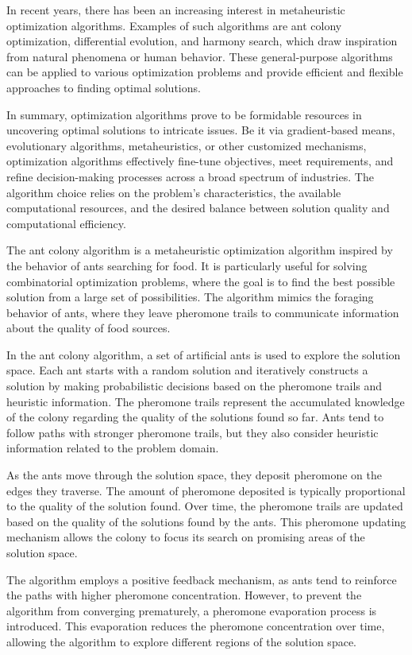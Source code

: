 In recent years, there has been an increasing interest in metaheuristic optimization algorithms. Examples of such algorithms are ant colony optimization, differential evolution, and harmony search, which draw inspiration from natural phenomena or human behavior. These general-purpose algorithms can be applied to various optimization problems and provide efficient and flexible approaches to finding optimal solutions.

In summary, optimization algorithms prove to be formidable resources in uncovering optimal solutions to intricate issues. Be it via gradient-based means, evolutionary algorithms, metaheuristics, or other customized mechanisms, optimization algorithms effectively fine-tune objectives, meet requirements, and refine decision-making processes across a broad spectrum of industries. The algorithm choice relies on the problem's characteristics, the available computational resources, and the desired balance between solution quality and computational efficiency.

The ant colony algorithm is a metaheuristic optimization algorithm inspired by the behavior of ants searching for food. It is particularly useful for solving combinatorial optimization problems, where the goal is to find the best possible solution from a large set of possibilities. The algorithm mimics the foraging behavior of ants, where they leave pheromone trails to communicate information about the quality of food sources.

In the ant colony algorithm, a set of artificial ants is used to explore the solution space. Each ant starts with a random solution and iteratively constructs a solution by making probabilistic decisions based on the pheromone trails and heuristic information. The pheromone trails represent the accumulated knowledge of the colony regarding the quality of the solutions found so far. Ants tend to follow paths with stronger pheromone trails, but they also consider heuristic information related to the problem domain.

As the ants move through the solution space, they deposit pheromone on the edges they traverse. The amount of pheromone deposited is typically proportional to the quality of the solution found. Over time, the pheromone trails are updated based on the quality of the solutions found by the ants. This pheromone updating mechanism allows the colony to focus its search on promising areas of the solution space.

The algorithm employs a positive feedback mechanism, as ants tend to reinforce the paths with higher pheromone concentration. However, to prevent the algorithm from converging prematurely, a pheromone evaporation process is introduced. This evaporation reduces the pheromone concentration over time, allowing the algorithm to explore different regions of the solution space.

